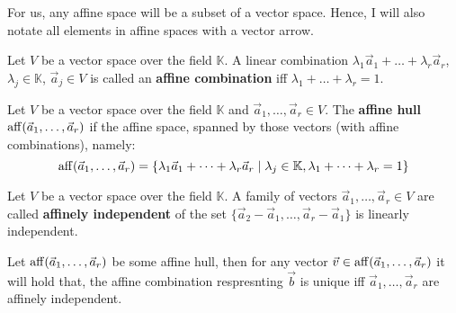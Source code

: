 For us, any affine space will be a subset of a vector space. Hence, I will also notate all elements in affine spaces with a vector arrow. 

\begin{definition}
    Let $V$ be a vector space over the field $\mathbb{K}$. A linear combination $\lambda_1 \vec a_1 + \dots + \lambda_r \vec a_r$, $\lambda_j \in \mathbb{K}$, $\vec a_j \in V$ is called an \textbf{affine combination} iff $\lambda_1 + \dots + \lambda_r = 1$.
\end{definition}
    
\begin{definition}
    Let $V$ be a vector space over the field $\mathbb{K}$ and $\vec a_1, \dots, \vec a_r \in V$. The \textbf{affine hull} $\operatorname{aff}(\vec a_1, \dots, \vec a_r)$ if the affine space, spanned by those vectors (with affine combinations), namely:
    $$\operatorname{aff}(\vec a_1, \dots, \vec a_r) = \{\lambda_1 \vec a_1 + \dots + \lambda_r \vec a_r \mid \lambda_j \in \mathbb{K}, \lambda_1 + \dots + \lambda_r = 1\}$$
\end{definition}
\begin{definition}
    Let $V$ be a vector space over the field $\mathbb{K}$. A family of vectors $\vec a_1, \dots, \vec a_r \in V$ are called \textbf{affinely independent} of the set $\{\vec a_2 - \vec a_1, \dots, \vec a_r - \vec a_1\}$ is linearly independent.
\end{definition}
\begin{observation}
    \label{obs:aff_combi_unique}
    Let $\operatorname{aff}(\vec a_1, \dots, \vec a_r)$ be some affine hull, then for any vector $\vec v \in \operatorname{aff}(\vec a_1, \dots, \vec a_r)$ it will hold that, the affine combination respresnting $\vec b$ is unique iff $\vec a_1, \dots, \vec a_r$ are affinely independent.
\end{observation}

